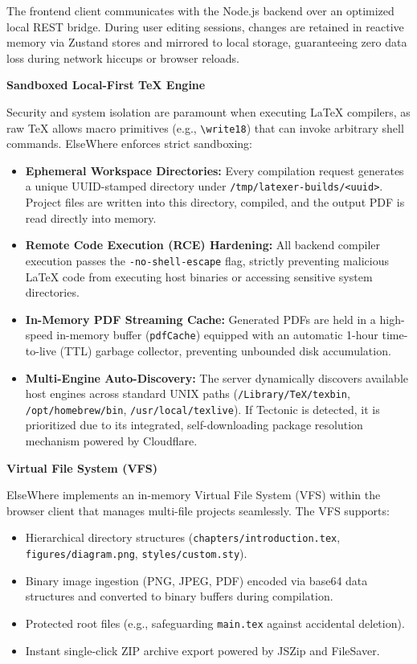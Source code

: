 \documentclass[12pt,a4paper,twoside]{article}
\newcommand{\subhead}[2]{%
  \begingroup\setlength{\parskip}{0pt}\vspace{10pt}%
  \noindent\hspace*{0.25in}\makebox[0.35in][l]{\fontsize{13pt}{15.6pt}\selectfont\bfseries #1}%
  {\fontsize{13pt}{15.6pt}\selectfont\bfseries #2}\par\nopagebreak
  \vspace{4pt}
  \endgroup}
\newcommand{\code}[1]{\texttt{#1}}
\begin{document}
The frontend client communicates with the Node.js backend over an optimized local REST bridge. During user editing sessions, changes are retained in reactive memory via Zustand stores and mirrored to local storage, guaranteeing zero data loss during network hiccups or browser reloads.

\subhead{3.2}{Sandboxed Local-First \TeX{} Engine}
Security and system isolation are paramount when executing \LaTeX{} compilers, as raw \TeX{} allows macro primitives (e.g., \code{\textbackslash write18}) that can invoke arbitrary shell commands. ElseWhere enforces strict sandboxing:
\begin{itemize}[leftmargin=0.4in,itemsep=2pt,topsep=2pt,parsep=0pt]
    \item \textbf{Ephemeral Workspace Directories:} Every compilation request generates a unique UUID-stamped directory under \code{/tmp/latexer-builds/<uuid>}. Project files are written into this directory, compiled, and the output PDF is read directly into memory.
    \item \textbf{Remote Code Execution (RCE) Hardening:} All backend compiler execution passes the \code{-no-shell-escape} flag, strictly preventing malicious \LaTeX{} code from executing host binaries or accessing sensitive system directories.
    \item \textbf{In-Memory PDF Streaming Cache:} Generated PDFs are held in a high-speed in-memory buffer (\code{pdfCache}) equipped with an automatic 1-hour time-to-live (TTL) garbage collector, preventing unbounded disk accumulation.
    \item \textbf{Multi-Engine Auto-Discovery:} The server dynamically discovers available host engines across standard UNIX paths (\code{/Library/TeX/texbin}, \code{/opt/homebrew/bin}, \code{/usr/local/texlive}). If Tectonic is detected, it is prioritized due to its integrated, self-downloading package resolution mechanism powered by Cloudflare.
\end{itemize}

\subhead{3.3}{Virtual File System (VFS)}
ElseWhere implements an in-memory Virtual File System (VFS) within the browser client that manages multi-file projects seamlessly. The VFS supports:
\begin{itemize}[leftmargin=0.4in,itemsep=2pt,topsep=2pt,parsep=0pt]
    \item Hierarchical directory structures (\code{chapters/\allowbreak introduction.tex}, \code{figures/\allowbreak diagram.png}, \code{styles/\allowbreak custom.sty}).
    \item Binary image ingestion (PNG, JPEG, PDF) encoded via base64 data structures and converted to binary buffers during compilation.
    \item Protected root files (e.g., safeguarding \code{main.tex} against accidental deletion).
    \item Instant single-click ZIP archive export powered by JSZip and FileSaver.
\end{itemize}
\end{document}
